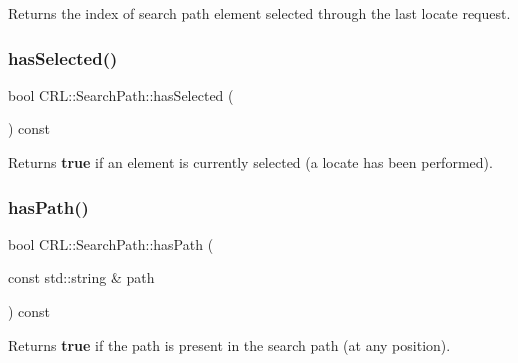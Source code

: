 \begin{DoxyReturn}{Returns}
the index of search path element selected through the last locate request. 
\end{DoxyReturn}
\mbox{\label{classCRL_1_1SearchPath_ac6a365281c272da46a02e68de2a401d1}} 
\subsubsection{\texorpdfstring{has\+Selected()}{hasSelected()}}
{\footnotesize\ttfamily bool C\+R\+L\+::\+Search\+Path\+::has\+Selected (\begin{DoxyParamCaption}{ }\end{DoxyParamCaption}) const\hspace{0.3cm}{\ttfamily [inline]}}

\begin{DoxyReturn}{Returns}
{\bfseries true} if an element is currently selected (a locate has been performed). 
\end{DoxyReturn}
\mbox{\label{classCRL_1_1SearchPath_a0e255b4339b5ec59bc8425bad057dc4f}} 
\subsubsection{\texorpdfstring{has\+Path()}{hasPath()}}
{\footnotesize\ttfamily bool C\+R\+L\+::\+Search\+Path\+::has\+Path (\begin{DoxyParamCaption}\item[{const std\+::string \&}]{path }\end{DoxyParamCaption}) const}

\begin{DoxyReturn}{Returns}
{\bfseries true} if the path is present in the search path (at any position). 
\end{DoxyReturn}
\mbox{\label{classCRL_1_1SearchPath_a2ba563c50865bc8417d65cf4a6b342d1}} 
